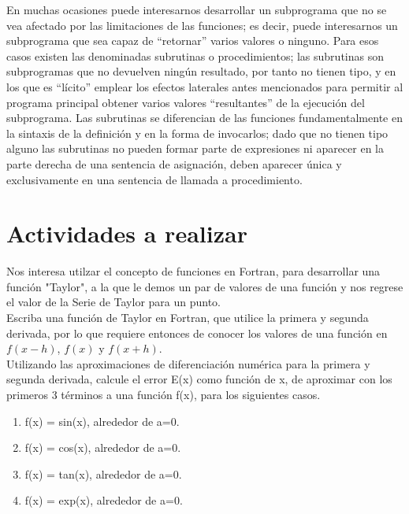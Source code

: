 \documentclass[12pt,a4paper,openright]{article}
\begin{document}
En muchas ocasiones puede interesarnos desarrollar un subprograma que no se vea afectado por las
limitaciones de las funciones; es decir, puede interesarnos un subprograma que sea capaz de “retornar” varios valores o
ninguno. Para esos casos existen las denominadas subrutinas o procedimientos; las subrutinas son subprogramas que
no devuelven ningún resultado, por tanto no tienen tipo, y en los que es “lícito” emplear los efectos laterales antes
mencionados para permitir al programa principal obtener varios valores “resultantes” de la ejecución del subprograma.
Las subrutinas se diferencian de las funciones fundamentalmente en la sintaxis de la definición y en la forma de
invocarlos; dado que no tienen tipo alguno las subrutinas no pueden formar parte de expresiones ni aparecer en la parte
derecha de una sentencia de asignación, deben aparecer única y exclusivamente en una sentencia de llamada a
procedimiento.




\section*{Actividades a realizar}


Nos interesa utilzar el concepto de funciones en Fortran, para desarrollar una función "Taylor", a la que le demos un par de valores de una función y nos regrese el valor de la Serie de Taylor para un punto.\\

Escriba una función de Taylor en Fortran, que utilice la primera y segunda derivada, por lo que requiere entonces de conocer los valores de una función en $f(x-h)$, $f(x)$  y $f(x+h)$. \\

Utilizando las aproximaciones de diferenciación numérica para la primera y segunda derivada, calcule el error E(x) como función de x, de aproximar con los primeros 3 términos a una función f(x), para los siguientes casos. \\

\begin{enumerate}

\item f(x) = sin(x), alrededor de a=0.
\item f(x) = cos(x), alrededor de a=0.
\item f(x) = tan(x), alrededor de a=0.
\item f(x) = exp(x), alrededor de a=0.

\end{enumerate}
 
\end{document}
